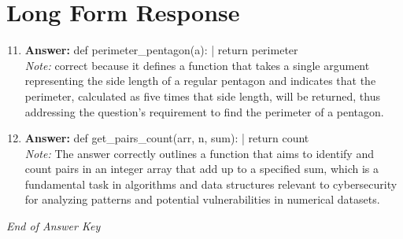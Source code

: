 \documentclass[12pt]{article}
\begin{document}
\section*{Long Form Response}
\begin{enumerate}[label=\arabic*.]
\setcounter{enumi}{10}
\item \textbf{Answer:} def perimeter\_pentagon(a): | return perimeter
\\ \textit{Note:} correct because it defines a function that takes a single argument representing the side length of a regular pentagon and indicates that the perimeter, calculated as five times that side length, will be returned, thus addressing the question's requirement to find the perimeter of a pentagon.
\item \textbf{Answer:} def get\_pairs\_count(arr, n, sum): | return count
\\ \textit{Note:} The answer correctly outlines a function that aims to identify and count pairs in an integer array that add up to a specified sum, which is a fundamental task in algorithms and data structures relevant to cybersecurity for analyzing patterns and potential vulnerabilities in numerical datasets.
\end{enumerate}

\vfill
\noindent\textit{End of Answer Key}
\end{document}

